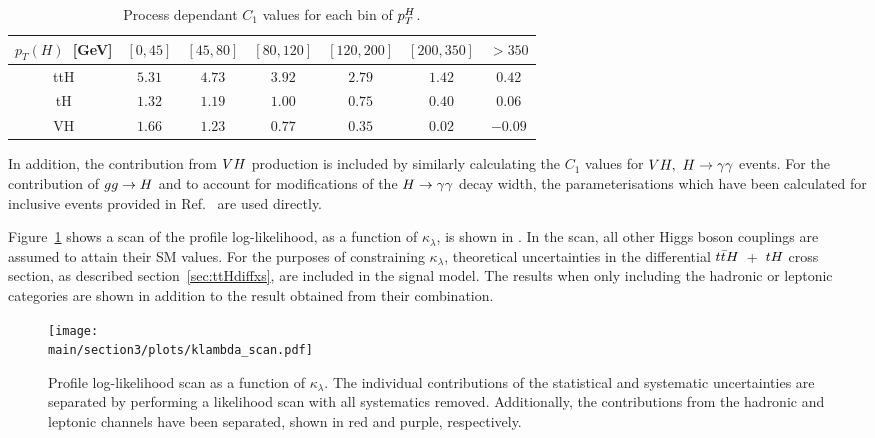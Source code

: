 \begin{table}[t!]
\begin{center}
\begin{tabular}{|c |c| c| c| c| c| c|}
\hline
   $p_T(H)$~[GeV] & $[0, 45]$  & $[45, 80]$ & $[80, 120]$ & $[120, 200]$ &  $[200, 350]$ &  $>350$ \\ 
\hline
\hline
ttH & $5.31$ & $4.73$ & $3.92$ & $2.79$ & $1.42$ & $0.42$ \\
\hline
tH & $1.32$ &$1.19$ & $1.00$ & $0.75$ & $0.40$ & $0.06$ \\
\hline 
VH & $1.66$ & $1.23$ & $0.77$ & $0.35$ & $0.02$ & $-0.09$ \\
\hline
\end{tabular}
 \caption{Process dependant $C_{1}$ values for each bin of $p_{T}^{H}$.}
\label{tab:ttHdiff_CMS_c1_values}
\end{center}
\end{table}


In addition, the contribution from $VH$ production is included by similarly calculating the $C_{1}$ values for $VH,~H\rightarrow\gamma\gamma$ events. For the contribution of $gg\rightarrow H$ and to account for modifications of the $H\rightarrow\gamma\gamma$ decay width, the parameterisations which have been calculated for inclusive events provided in Ref.~\cite{Degrassi:2016wml} are used directly.

Figure~\ref{fig:ttHdiff_CMS_klambda_scan} shows a scan of the profile log-likelihood, as a function of $\kappa_{\lambda}$, is shown in . In the scan, all other Higgs boson couplings are assumed to attain their SM values. For the purposes of constraining $\kappa_{\lambda}$, theoretical uncertainties in the differential $t\bar{t}H$~+~$tH$ cross section, as described section~\ref{sec:ttHdiffxs}, are included in the signal model. The results when only including the hadronic or leptonic categories are shown in addition to the result obtained from their combination. 

\begin{figure}[htb!]
        \centering
        \texttt{[image: \\main/section3/plots/klambda\_scan.pdf]}
        \caption{Profile log-likelihood scan as a function of $\kappa_\lambda$. The individual contributions of the statistical and systematic uncertainties are separated by performing a likelihood scan with all systematics removed. Additionally, the contributions from the hadronic and leptonic channels have been separated, shown in red and purple, respectively.}
        \label{fig:ttHdiff_CMS_klambda_scan}
\end{figure}


